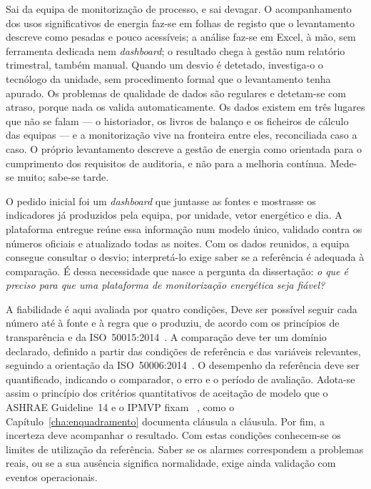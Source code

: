 Sai da equipa de monitorização de processo, e sai devagar. O
acompanhamento dos usos significativos de energia faz-se em folhas de
registo que o levantamento descreve como pesadas e pouco acessíveis; a
análise faz-se em Excel, à mão, sem ferramenta dedicada nem
\emph{dashboard}; o resultado chega à gestão num relatório trimestral,
também manual. Quando um desvio é detetado, investiga-o o tecnólogo da
unidade, sem procedimento formal que o levantamento tenha apurado. Os
problemas de qualidade de dados são regulares e detetam-se com atraso,
porque nada os valida automaticamente. Os dados existem em três lugares
que não se falam --- o historiador, os livros de balanço e os ficheiros
de cálculo das equipas --- e a monitorização vive na fronteira entre
eles, reconciliada caso a caso. O próprio levantamento descreve a gestão
de energia como orientada para o cumprimento dos requisitos de auditoria,
e não para a melhoria contínua. Mede-se muito; sabe-se tarde.

O pedido inicial foi um \emph{dashboard} que juntasse as fontes e
mostrasse os indicadores já produzidos pela equipa, por unidade, vetor
energético e dia. A plataforma entregue reúne essa informação num modelo
único, validado contra os números oficiais e atualizado todas as noites.
Com os dados reunidos, a equipa consegue consultar o desvio; interpretá-lo
exige saber se a referência é adequada à comparação. É dessa necessidade
que nasce a pergunta da dissertação: \emph{o que é preciso para que uma
plataforma de monitorização energética seja fiável?}

A fiabilidade é aqui avaliada por quatro condições,  Deve ser possível seguir cada
número até à fonte e à regra que o produziu, de acordo com os princípios
de transparência e  da ISO~50015:2014~\cite{ISO50015_2014}.
A comparação deve ter um domínio declarado, definido a partir das condições
de referência e das variáveis relevantes, seguindo a orientação da
ISO~50006:2014~\cite{ISO50006_2014}. O desempenho da referência deve ser
quantificado, indicando o comparador, o erro e o período de avaliação.
Adota-se assim o princípio dos critérios quantitativos de aceitação de
modelo que o ASHRAE Guideline~14 e o IPMVP fixam ~\cite{ASHRAE14_2014,IPMVP_2022}, como o
Capítulo~\ref{cha:enquadramento} documenta cláusula a cláusula.
Por fim, a incerteza deve acompanhar o resultado. Com estas condições
conhecem-se os limites de utilização da referência. Saber se os alarmes
correspondem a problemas reais, ou se a sua ausência significa
normalidade, exige ainda validação com eventos operacionais.


